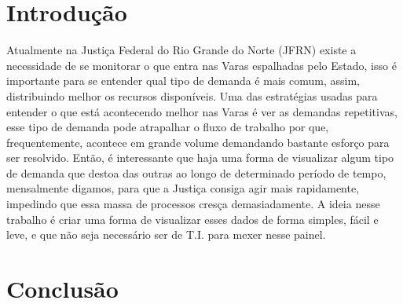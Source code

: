 \chapter{Introdução}

Atualmente na Justiça Federal do Rio Grande do Norte (JFRN) existe a necessidade de se monitorar o que entra nas Varas espalhadas pelo Estado, isso é importante para se entender qual tipo de demanda é mais comum, assim, distribuindo melhor os recursos disponíveis. Uma das estratégias usadas para entender o que está acontecendo melhor nas Varas é ver as demandas repetitivas, esse tipo de demanda pode atrapalhar o fluxo de trabalho por que, frequentemente, acontece em grande volume demandando bastante esforço para ser resolvido. Então, é interessante que haja uma forma de visualizar algum tipo de demanda que destoa das outras ao longo de determinado período de tempo, mensalmente digamos, para que a Justiça consiga agir mais rapidamente, impedindo que essa massa de processos cresça demasiadamente. A ideia nesse trabalho é criar uma forma de visualizar esses dados de forma simples, fácil e leve, e que não seja necessário ser de T.I. para mexer nesse painel. \cite{ibge1993}





\chapter{Conclusão}
